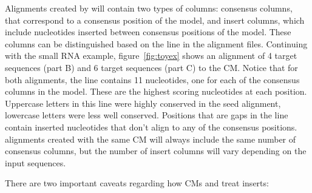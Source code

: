 Alignments created by  will contain two types of
columns: consensus columns, that correspond to a consensus position of
the model, and insert columns, which include nucleotides inserted
between consensus positions of the model. These columns can be
distinguished based on the  line in the alignment
files. Continuing with the small RNA example, figure~\ref{fig:toyex}
shows an alignment of 4 target sequences (part B) and 6 target
sequences (part C) to the CM. Notice that for both alignments, the
 line contains 11 nucleotides, one for each of the
consensus columns in the model. These are the highest scoring
nucleotides at each position. Uppercase letters in this line were
highly conserved in the seed alignment, lowercase letters were less
well conserved. Positions that are gaps in the  line
contain inserted nucleotides that don't align to any of the consensus
positions. 
 alignments created with the same CM will
always include the same number of consensus columns, but the number of
insert columns will vary depending on the input sequences.

There are two important caveats regarding how CMs and 
treat inserts:


